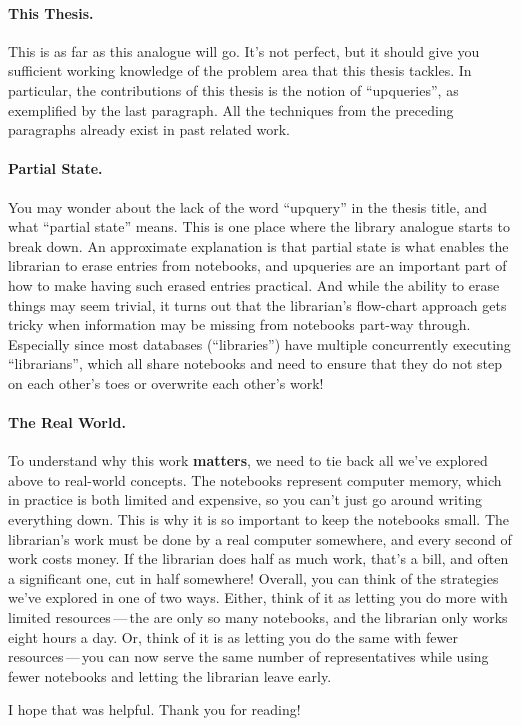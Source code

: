 \paragraph{This Thesis.}
%
This is as far as this analogue will go. It's not perfect, but it should give
you sufficient working knowledge of the problem area that this thesis tackles.
In particular, the contributions of this thesis is the notion of ``upqueries'',
as exemplified by the last paragraph. All the techniques from the preceding
paragraphs already exist in past related work.

\paragraph{Partial State.}
%
You may wonder about the lack of the word ``upquery'' in the thesis title, and
what ``partial state'' means. This is one place where the library analogue
starts to break down. An approximate explanation is that partial state is what
enables the librarian to erase entries from notebooks, and upqueries are an
important part of how to make having such erased entries practical. And while
the ability to erase things may seem trivial, it turns out that the librarian's
flow-chart approach gets tricky when information may be missing from notebooks
part-way through. Especially since most databases (``libraries'') have multiple
concurrently executing ``librarians'', which all share notebooks and need to
ensure that they do not step on each other's toes or overwrite each other's
work!

\paragraph{The Real World.}
%
To understand why this work \textbf{matters}, we need to tie back all we've
explored above to real-world concepts. The notebooks represent computer memory,
which in practice is both limited and expensive, so you can't just go around
writing everything down. This is why it is so important to keep the notebooks
small. The librarian's work must be done by a real computer somewhere, and every
second of work costs money. If the librarian does half as much work, that's a
bill, and often a significant one, cut in half somewhere! Overall, you can think
of the strategies we've explored in one of two ways. Either, think of it as
letting you do more with limited resources\,---\,the are only so many notebooks,
and the librarian only works eight hours a day. Or, think of it is as letting
you do the same with fewer resources\,---\,you can now serve the same number of
representatives while using fewer notebooks and letting the librarian leave
early.

I hope that was helpful. Thank you for reading!
